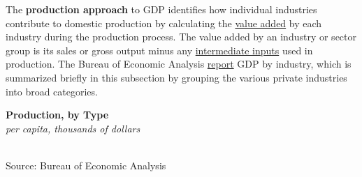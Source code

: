 \documentclass{report}
\makeatletter
\newcommand{\tbllink}[1]{\href{https://raw.githubusercontent.com/bdecon/US-chartbook/master/chartbook/data/#1}{\faTable}}
\newcommand*\short[1]{\expandafter\@gobbletwo\number\numexpr#1\relax}
\newcommand{\stdnode}[3]{\node[below, align=left, shift=({#1,#2})]{#3};}
\newcommand{\shdateaxisticks}{
		date coordinates in=x, axis line style={draw=none},
		xmax={2024-01-31},
		max space between ticks=40,	    
		xtick={{1990-01-01}, {1995-01-01}, {2000-01-01}, 
			{2005-01-01}, {2010-01-01}, {2015-01-01}, {2020-01-01}},
		minor xtick={},
		enlarge y limits={0.06}, enlarge x limits={0.01},
		xticklabel style={align=center, yshift=-2pt}, tick label style={inner sep=0pt},
		}
\newcommand{\bbar}[2]{extra #1 ticks = {{#2}}, extra #1 tick labels = ,
		extra #1 tick style = {grid=major, grid style={thick, black!25}},}
\newcommand{\stdline}[4]{\addplot[very thick, no markers, color=#1] 
		table [x=#2, y=#3, col sep=comma] {#4};	}
\newcommand{\rebars}{
		\fill[color=black!10] (axis cs:{2007-12-01},\pgfkeysvalueof{/pgfplots/ymin}) 
			rectangle (axis cs:{2009-07-01}, \pgfkeysvalueof{/pgfplots/ymax});
		\fill[color=black!10] (axis cs:{2001-03-01},\pgfkeysvalueof{/pgfplots/ymin}) 
			rectangle (axis cs:{2001-11-01}, \pgfkeysvalueof{/pgfplots/ymax});
		\fill[color=black!10] (axis cs:{2020-02-01},\pgfkeysvalueof{/pgfplots/ymin}) 
			rectangle (axis cs:{2020-05-01}, \pgfkeysvalueof{/pgfplots/ymax});}
\makeatother
\begin{document}
\begin{minipage}{1.0\textwidth}
\small The \textbf{production approach} to GDP identifies how individual industries contribute to domestic production by calculating the \href{https://www.bea.gov/help/glossary/value-added}{value added} by each industry during the production process. The value added by an industry or sector group is its sales or gross output minus any \href{https://www.bea.gov/help/glossary/intermediate-inputs}{intermediate inputs} used in production. The Bureau of Economic Analysis \href{https://www.bea.gov/data/gdp/gdp-industry}{report} GDP by industry, which is summarized briefly in this subsection by grouping the various private industries into broad categories. 


\end{minipage}
\vspace{1mm}

\begin{minipage}{0.36\textwidth}
\noindent \normalsize \textbf{Production, by Type}\\
\footnotesize{\textit{per capita, thousands of dollars}}\\
\noindent \hspace*{-1mm} \\
\footnotesize{Source: Bureau of Economic Analysis} \hfill \tbllink{gdpva_pc.csv}\\
\end{minipage}\hspace{5mm}
\begin{minipage}{0.36\textwidth}
\small  
\end{minipage}
\vspace{1mm}
\end{document}
